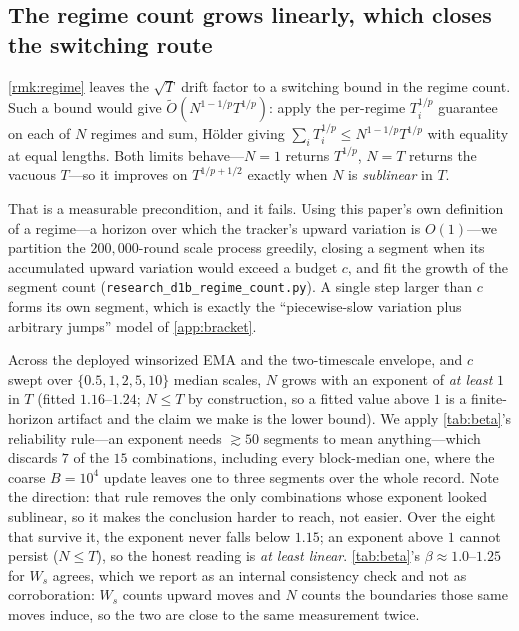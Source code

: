 \documentclass{article}
\begin{document}
\subsection{The regime count grows linearly, which closes the switching route}
\label{app:regimecount}

\cref{rmk:regime} leaves the $\sqrt T$ drift factor to a switching bound in the regime count.
Such a bound would give $\tilde O(N^{1-1/p}T^{1/p})$: apply the per-regime $T_i^{1/p}$ guarantee
on each of $N$ regimes and sum, H\"older giving $\sum_i T_i^{1/p}\le N^{1-1/p}T^{1/p}$ with
equality at equal lengths. Both limits behave---$N{=}1$ returns $T^{1/p}$, $N{=}T$ returns the
vacuous $T$---so it improves on $T^{1/p+1/2}$ exactly when $N$ is \emph{sublinear} in $T$.

That is a measurable precondition, and it fails. Using this paper's own definition of a
regime---a horizon over which the tracker's upward variation is $O(1)$---we partition the
$200{,}000$-round scale process greedily, closing a segment when its accumulated upward
variation would exceed a budget $c$, and fit the growth of the segment count
(\texttt{research\_d1b\_regime\_count.py}). A single step larger than $c$ forms its own segment,
which is exactly the ``piecewise-slow variation plus arbitrary jumps'' model of
\cref{app:bracket}.

Across the deployed winsorized EMA and the two-timescale envelope, and $c$ swept over
$\{0.5,1,2,5,10\}$ median scales, $N$ grows with an exponent of \emph{at least} $1$ in $T$
(fitted $1.16$--$1.24$; $N\le T$ by construction, so a fitted value above $1$ is a
finite-horizon artifact and the claim we make is the lower bound). We apply
\cref{tab:beta}'s reliability rule---an exponent needs ${\gtrsim}50$ segments to mean
anything---which discards $7$ of the $15$ combinations, including every block-median one, where
the coarse $B{=}10^4$ update leaves one to three segments over the whole record. Note the
direction: that rule removes the only combinations whose exponent looked sublinear, so it makes
the conclusion harder to reach, not easier. Over the eight that survive it, the exponent never
falls below $1.15$; an exponent above $1$ cannot persist ($N\le T$), so the honest reading is
\emph{at least linear}. \cref{tab:beta}'s $\beta\approx1.0$--$1.25$ for $W_s$ agrees, which we
report as an internal consistency check and not as corroboration: $W_s$ counts upward moves and
$N$ counts the boundaries those same moves induce, so the two are close to the same measurement
twice.
\end{document}
